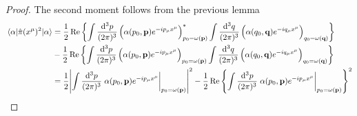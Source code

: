 \qkgcoherentmomentumdensityvar
\begin{proof}
	The second moment follows from the previous lemma
	\begin{equation*}
		\begin{split}
			\expval{\hat\pi(x^\mu)^2}{\alpha}
			&=
			\frac{1}{2}
			\Re\left\{
				\int\frac{\dd[3]{p}}{(2\pi)^3}
				\left(
					\alpha(p_0,\vb{p})
					e^{-ip_\mu x^\mu}
				\right)^*_{p_0=\omega(\vb{p})}
				\int\frac{\dd[3]{q}}{(2\pi)^3}
				\left(
					\alpha(q_0,\vb{q})
					e^{-iq_\mu x^\mu}
				\right)_{q_0=\omega(\vb{q})}			
			\right\}
			\\
			&-
			\frac{1}{2}
			\Re\left\{
				\int\frac{\dd[3]{p}}{(2\pi)^3}
				\left(
					\alpha(p_0,\vb{p})
					e^{-ip_\mu x^\mu}
				\right)_{p_0=\omega(\vb{p})}
				\int\frac{\dd[3]{q}}{(2\pi)^3}
				\left(
					\alpha(q_0,\vb{q})
					e^{-iq_\mu x^\mu}
				\right)_{q_0=\omega(\vb{q})}
			\right\}
			\\
			&=
			\frac{1}{2}
			\abs{
				\int\frac{\dd[3]{p}}{(2\pi)^3}
				\eval{
					\alpha(p_0,\vb{p})
					e^{-ip_\mu x^\mu}
				}_{p_0=\omega(\vb{p})}
			}^2
			-
			\frac{1}{2}
			\Re\left\{
				\int\frac{\dd[3]{p}}{(2\pi)^3}
				\eval{
					\alpha(p_0,\vb{p})
					e^{-ip_\mu x^\mu}
				}_{p_0=\omega(\vb{p})}
			\right\}^2
		\end{split}
	\end{equation*}
\end{proof}
